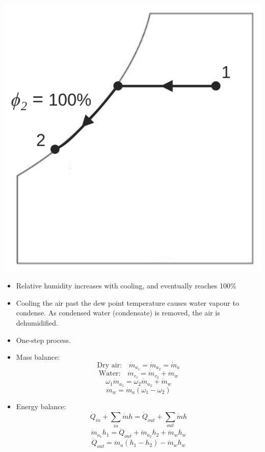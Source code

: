 \documentclass[11pt]{article}
\begin{document}
\begin{center}
\includegraphics[scale=0.5]{./images/cooling-with-dehumidification-psychrometric-chart.png}
\end{center}
\begin{itemize}
\item Relative humidity increases with cooling, and eventually reaches 100\%
\item Cooling the air past the dew point temperature causes water vapour to condense. As condensed water (condensate) is removed, the air is dehumidified.
\item One-step process.
\item Mass balance:
\[\text{Dry air:} \quad \dot{m}_{a_1} = \dot{m}_{a_2} = \dot{m}_a\]
\[\text{Water:} \quad \dot{m}_{v_1} = \dot{m}_{v_2} + \dot{m}_w\]
\[\omega_1 \dot{m}_{a_1} = \omega_2 \dot{m}_{a_2} + \dot{m}_w\]
\[\dot{m}_w = \dot{m}_a (\omega_1 - \omega_2)\]
\item Energy balance:
\[\dot{Q}_{in} + \sum_{in} \dot{m} h = \dot{Q}_{out} + \sum_{out} \dot{m} h\]
\[\dot{m}_{a_1} h_1 = \dot{Q}_{out} + \dot{m}_{a_2} h_2 + \dot{m}_{w} h_w\]
\[\dot{Q}_{out} = \dot{m}_a (h_1 - h_2) - \dot{m}_w h_w\]
\end{itemize}
\end{document}
